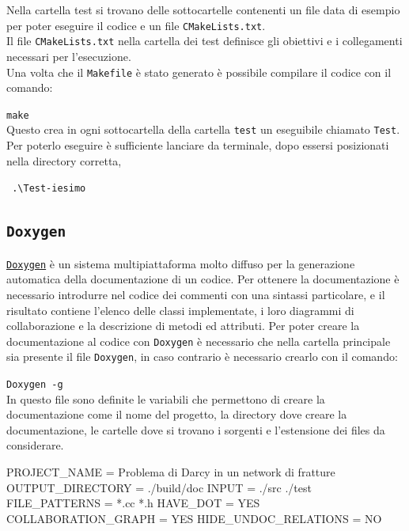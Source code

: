 \par \noindent Nella cartella test si trovano delle sottocartelle contenenti un file data di esempio per poter eseguire il codice e un file  \texttt{CMakeLists.txt}.\\
\noindent Il file  \texttt{CMakeLists.txt} nella cartella dei test definisce gli obiettivi e i collegamenti necessari per l'esecuzione. \\

\noindent Una volta che il \texttt{Makefile} è stato generato è possibile compilare il codice con il comando: \\ 
\par \texttt{make}\\

\noindent Questo crea in ogni sottocartella della cartella \texttt{test} un eseguibile chiamato \texttt{Test}. Per poterlo eseguire è sufficiente lanciare da terminale, dopo essersi posizionati nella directory corretta, 
\par \texttt{ .\textbackslash Test-iesimo }

\subsection{\texttt{Doxygen}}
\href{www.doxygen.org/}{\texttt{Doxygen}} è un sistema multipiattaforma molto diffuso per la generazione automatica della documentazione di un codice. Per ottenere la documentazione è necessario introdurre nel codice dei commenti con una sintassi particolare, e il risultato contiene l’elenco delle classi implementate, i loro diagrammi di collaborazione e la descrizione di metodi ed attributi.
Per poter creare la documentazione al codice con \texttt{Doxygen} è necessario che nella cartella principale sia presente il file \texttt{Doxygen}, in caso contrario è necessario crearlo con il comando:\\
\par \texttt{Doxygen -g}\\

\noindent In questo file sono definite le variabili che permettono di creare la documentazione come il nome del progetto, la directory dove creare la documentazione, le cartelle dove si trovano i sorgenti e l'estensione dei files da considerare.

\begin{Code03_01}
PROJECT_NAME 				=	 Problema di Darcy in un network di fratture
OUTPUT_DIRECTORY			=	./build/doc
INPUT						= 	./src ./test
FILE_PATTERNS				= 	*.cc *.h
HAVE_DOT					=	YES
COLLABORATION_GRAPH		=	YES
HIDE_UNDOC_RELATIONS		=	NO
\end{Code03_01}

